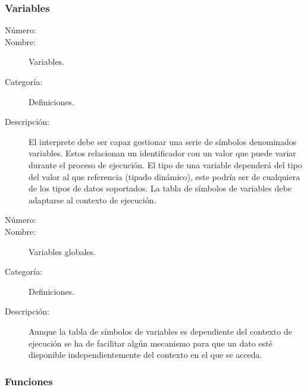 \subsubsection{Variables}
\begin{framed}
	\begin{description}
		\item [Número:] \cn
		\item [Nombre:] Variables.
		\item [Categoría:] Definiciones.
		\item [Descripción:] El interprete debe ser capaz gestionar una serie de símbolos
		denominados variables. Estos relacionan un identificador con un valor que puede variar durante el proceso de ejecución. El tipo
		de una variable dependerá del tipo del valor al que referencia (tipado dinámico), este podría ser de cualquiera de los tipos de
		datos soportados. La tabla de símbolos de variables debe adaptarse al contexto de ejecución.
	\end {description}
\end{framed}

\begin{framed}
	\begin{description}
		\item [Número:] \cn
		\item [Nombre:] Variables globales.
		\item [Categoría:] Definiciones.
		\item [Descripción:] Aunque la tabla de símbolos de variables es dependiente del contexto de ejecución se
		ha de facilitar algún mecanismo para que un dato esté disponible independientemente del contexto en el que
		se acceda.
	\end {description}
\end{framed}

\subsubsection{Funciones}

